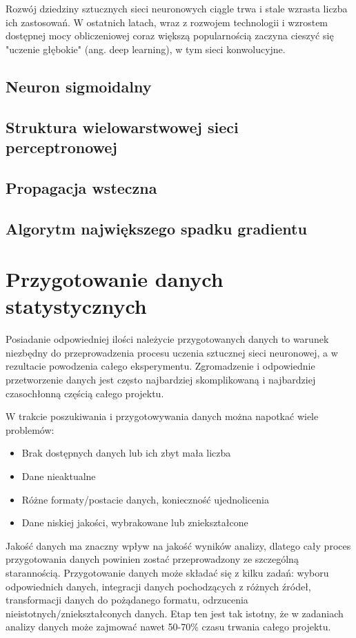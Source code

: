 Rozwój dziedziny sztucznych sieci neuronowych ciągle trwa i stale wzrasta liczba ich zastosowań. W ostatnich latach, wraz z rozwojem technologii i wzrostem dostępnej mocy obliczeniowej coraz większą popularnością zaczyna cieszyć się "uczenie głębokie" (ang. deep learning), w tym sieci konwolucyjne.

\section{Neuron sigmoidalny}
\label{Sec:ThSig}

\section{Struktura wielowarstwowej sieci perceptronowej}
\label{Sec:ThMLP}

\section{Propagacja wsteczna}
\label{Sec:ThBackprop}

\section{Algorytm największego spadku gradientu}
\label{Sec:ThGrad}

\chapter{Przygotowanie danych statystycznych}
Posiadanie odpowiedniej ilości należycie przygotowanych danych to warunek niezbędny do przeprowadzenia procesu uczenia sztucznej sieci neuronowej, a w rezultacie powodzenia całego eksperymentu. Zgromadzenie i odpowiednie przetworzenie danych jest często najbardziej skomplikowaną i najbardziej czasochłonną częścią całego projektu. 

W trakcie poszukiwania i przygotowywania danych można napotkać wiele problemów:
\begin{itemize}
\item Brak dostępnych danych lub ich zbyt mała liczba
\item Dane nieaktualne
\item Różne formaty/postacie danych, konieczność ujednolicenia
\item Dane niskiej jakości, wybrakowane lub zniekształcone
\end{itemize}

Jakość danych ma znaczny wpływ na jakość wyników analizy, dlatego cały proces przygotowania danych powinien zostać przeprowadzony ze szczególną starannością. Przygotowanie danych może składać się z kilku zadań: wyboru odpowiednich danych, integracji danych pochodzących z różnych źródeł, transformacji danych do pożądanego formatu, odrzucenia nieistotnych/zniekształconych danych. Etap ten jest tak istotny, że w zadaniach analizy danych może zajmować nawet 50-70\% czasu trwania całego projektu.\cite{satt01}

